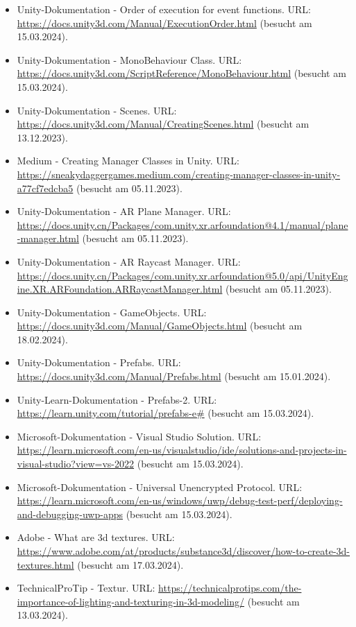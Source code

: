 \begin{itemize}[leftmargin=0pt]
    \item Unity-Dokumentation - Order of execution for event functions. {\scriptsize URL:} \url{https://docs.unity3d.com/Manual/ExecutionOrder.html} (besucht am 15.03.2024).
    \item Unity-Dokumentation - MonoBehaviour Class. {\scriptsize URL:} \url{https://docs.unity3d.com/ScriptReference/MonoBehaviour.html} (besucht am 15.03.2024).
    \item Unity-Dokumentation - Scenes. {\scriptsize URL:} \url{https://docs.unity3d.com/Manual/CreatingScenes.html} (besucht am 13.12.2023).
    \item Medium - Creating Manager Classes in Unity. {\scriptsize URL:} \url{https://sneakydaggergames.medium.com/creating-manager-classes-in-unity-a77cf7edcba5} (besucht am 05.11.2023).
    \item Unity-Dokumentation - AR Plane Manager. {\scriptsize URL:} \url{https://docs.unity.cn/Packages/com.unity.xr.arfoundation@4.1/manual/plane-manager.html} (besucht am 05.11.2023).
    \item Unity-Dokumentation - AR Raycast Manager. {\scriptsize URL:} \url{https://docs.unity.cn/Packages/com.unity.xr.arfoundation@5.0/api/UnityEngine.XR.ARFoundation.ARRaycastManager.html} (besucht am 05.11.2023).
    \item Unity-Dokumentation - GameObjects. {\scriptsize URL:} \url{https://docs.unity3d.com/Manual/GameObjects.html} (besucht am 18.02.2024).
    \item Unity-Dokumentation - Prefabs. {\scriptsize URL:} \url{https://docs.unity3d.com/Manual/Prefabs.html} (besucht am 15.01.2024).
    \item Unity-Learn-Dokumentation - Prefabs-2. {\scriptsize URL:} \url{https://learn.unity.com/tutorial/prefabs-e#} (besucht am 15.03.2024).
    \item Microsoft-Dokumentation - Visual Studio Solution. {\scriptsize URL:} \url{https://learn.microsoft.com/en-us/visualstudio/ide/solutions-and-projects-in-visual-studio?view=vs-2022} (besucht am 15.03.2024).
    \item Microsoft-Dokumentation - Universal Unencrypted Protocol. {\scriptsize URL:} \url{https://learn.microsoft.com/en-us/windows/uwp/debug-test-perf/deploying-and-debugging-uwp-apps} (besucht am 15.03.2024).
    \item Adobe - What are 3d textures. {\scriptsize URL:} \url{https://www.adobe.com/at/products/substance3d/discover/how-to-create-3d-textures.html} (besucht am 17.03.2024).
    \item TechnicalProTip - Textur. {\scriptsize URL:} \url{https://technicalprotips.com/the-importance-of-lighting-and-texturing-in-3d-modeling/} (besucht am 13.03.2024).

\end{itemize}
